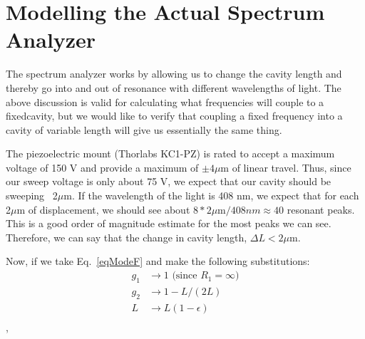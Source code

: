 \section{Modelling the Actual Spectrum Analyzer}

The spectrum analyzer works by allowing us to change the cavity length and thereby go into and out of resonance with different wavelengths of light. The above discussion is valid for calculating what frequencies will couple to a fixedcavity, but we would like to verify that coupling a fixed frequency into a cavity of variable length will give us essentially the same thing.


The piezoelectric mount (Thorlabs KC1-PZ) is rated to accept a maximum voltage of 150 V and provide a maximum of $\pm4\mu$m of linear travel. Thus, since our sweep voltage is only about 75 V, we expect that our cavity should be sweeping ~2$\mu$m. If the wavelength of the light is 408 nm, we expect that for each 2$\mu$m of displacement, we should see about $8*2\mu$m$/408nm \approx 40$ resonant peaks. This is a good order of magnitude estimate for the most peaks we can see. Therefore, we can say that the change in cavity length, $\Delta L< 2\mu$m.

Now, if we take Eq.\ \ref{eqModeF} and make the following substitutions:
\begin{align}
g_1&\rightarrow1 \text{ (since $R_1=\infty$)} \\
g_2&\rightarrow 1-L/(2L)\\
L&\rightarrow L(1-\epsilon)\\
\end{align},

